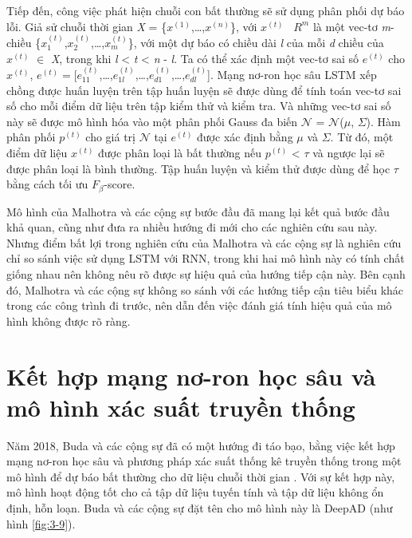 Tiếp đến, công việc phát hiện chuỗi con bất thường sẽ sử dụng phân phối dự báo lỗi. Giả sử chuỗi thời gian  \textit{X} = \{$x^{(1)}$,…,$x^{(n)}$\}, với $x^{(t)}$ \in \ $R^{m}$ là một vec-tơ \textit{m}-chiều \{$x_{1}^{(t)}$,$x_{2}^{(t)}$,…,$x_{m}^{(t)}$\}, với một dự báo có chiều dài \textit{l} của mỗi \textit{d} chiều của $x^{(t)}$ $\in$ \textit{X}, trong khi \textit{l} < \textit{t} < \textit{n} - \textit{l}. Ta có thể xác định một vec-tơ sai số $e^{(t)}$ cho $x^{(t)}$, $e^{(t)}=[e_{11}^{(t)}$,…,$e_{1l}^{(t)}$,…,$e_{d1}^{(t)}$,…,$e_{dl}^{(t)}$]. Mạng nơ-ron học sâu LSTM xếp chồng được huấn luyện trên tập huấn luyện sẽ được dùng để tính toán vec-tơ sai số cho mỗi điểm dữ liệu trên tập kiểm thử và kiểm tra. Và những vec-tơ sai số này sẽ được mô hình hóa vào một phân phối Gauss đa biến $\mathcal{N}$ = $\mathcal{N}$($\mu$, $\Sigma$). Hàm phân phối $p^{(t)}$ cho giá trị $\mathcal{N}$ tại $e^{(t)}$ được xác định bằng $\mu$ và $\Sigma$. Từ đó, một điểm dữ liệu $x^{(t)}$ được phân loại là bất thường nếu $p^{(t)}$ < $\tau$ và ngược lại sẽ được phân loại là bình thường. Tập huấn luyện và kiểm thử được dùng để học $\tau$ bằng cách tối ưu $F_\beta$-score.

Mô hình của Malhotra và các cộng sự bước đầu đã mang lại kết quả bước đầu khả quan, cũng như đưa ra nhiều hướng đi mới cho các nghiên cứu sau này. Nhưng điểm bất lợi trong nghiên cứu của Malhotra và các cộng sự là nghiên cứu chỉ so sánh việc sử dụng LSTM với RNN, trong khi hai mô hình này có tính chất giống nhau nên không nêu rõ được sự hiệu quả của hướng tiếp cận này. Bên cạnh đó, Malhotra và các cộng sự không so sánh với các hướng tiếp cận tiêu biểu khác trong các công trình đi trước, nên dẫn đến việc đánh giá tính hiệu quả của mô hình không được rõ ràng.

\section{Kết hợp mạng nơ-ron học sâu và mô hình xác suất truyền thống}
Năm 2018, Buda và các cộng sự đã có một hướng đi táo bạo, bằng việc kết hợp mạng nơ-ron học sâu và phương pháp xác suất thống kê truyền thống trong một mô hình để dự báo bất thường cho dữ liệu chuỗi thời gian \cite{st15}. Với sự kết hợp này, mô hình hoạt động tốt cho cả tập dữ liệu tuyến tính và tập dữ liệu không ổn định, hỗn loạn. Buda và các cộng sự đặt tên cho mô hình này là DeepAD (như hình \ref{fig:3-9}).

